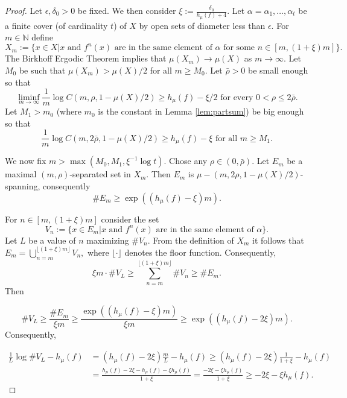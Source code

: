 \documentclass{amsart}
\theoremstyle{plain}
\theoremstyle{definition}
\theoremstyle{remark}
\numberwithin{equation}{section}
\begin{document}
\begin{proof}
Let $\epsilon, \delta_0>0 $ be fixed. We then consider $\xi :=  \frac{\delta_0}{  h_{\mu}(f)   + 4 }$.
Let $\alpha = \alpha_1, \ldots, \alpha_t$ be a finite cover (of cardinality $t$) of $X$ by open sets of diameter less than $\epsilon$. 
For $m\in \mathbb{N}$ define
$$  X_m := \{  x\in X | x \text{ and } f^n(x) \text{ are in the same element of }\alpha \text{ for some }  n\in [m, (1+\xi) m]    \}.   $$
The Birkhoff Ergodic Theorem implies that $\mu(X_m) \to \mu(X)$ as $m\to \infty$. Let $M_0$ be such that $ \mu(X_m)> \mu(X)/2  $ for all $m\geq M_0$.
Let $\bar{\rho}>0$ be small enough so that $$  \liminf_{m\to \infty}   \frac{1}{m} \log   C(m,\rho,1-\mu(X)/2)   \geq    h_{\mu}(f)    - \xi/2 \text{ for every } 0< \rho\leq 2 \bar{\rho}.$$
Let $M_1 > m_0$ (where $m_0$ is the constant in Lemma \ref{lem:partsum}) be big enough so that $$\frac{1}{m} \log   C(m,2\bar{\rho},1-\mu(X)/2)   \geq  h_{\mu}(f) - \xi \text{ for all } m\geq M_1.$$

We now fix $m> \max(  M_0, M_1, \xi^{-1}\log t    ).$ Chose any $\rho \in (0 ,\bar{\rho})$.
Let $E_m$ be a maximal $(m,\rho)$-separated set in $X_m$.
Then $E_m$  is $\mu-(m,2 \rho,1-\mu(X)/2)$-spanning, consequently
$$\# E_m \geq  \exp ((h_{\mu}(f) - \xi)m ).   $$ 





For $n\in [m, (1+\xi)m]$ consider the set
$$   V_n :=  \{  x\in E_m | x \text{ and } f^n(x) \text{ are in the same element of }\alpha   \}.      $$
Let $L$ be a value of $n$ maximizing $\# V_n$. 
From the definition of $X_m$ it follows that $E_m=\bigcup_{n=m}^{\lfloor  (1+\xi)m  \rfloor} V_n,$ where $\lfloor \cdot \rfloor$ denotes the floor function.
Consequently, $$  \xi m \cdot \# V_L  \geq \sum_{n=m}^{\lfloor  (1+\xi)m  \rfloor}  \#V_n \geq \# E_m.$$
Then


$$\# V_L\geq    \frac{ \# E_m }{  \xi m    }     \geq     \frac{    \exp ((h_{\mu}(f) - \xi)m )   }{\xi m}   \geq    \exp ((h_{\mu}(f) - 2\xi)m ).    $$ 
Consequently,

\begin{align*}
\frac{1}{L} \log \#V_L   - h_{\mu}(f) &=  (h_{\mu}(f) - 2\xi)\frac{m}{L}   - h_{\mu}(f) \geq   (h_{\mu}(f) - 2\xi)\frac{1}{1+\xi}   - h_{\mu}(f) \\
& =   \frac{    h_{\mu}(f) - 2\xi -   h_{\mu}(f) - \xi  h_{\mu}(f)    }{1+\xi}  =\frac{    - 2\xi - \xi  h_{\mu}(f)    }{1+\xi} \geq    - 2\xi - \xi  h_{\mu}(f) . 
\end{align*}


\end{proof}
\end{document}
